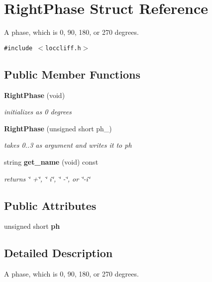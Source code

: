 \section{Right\-Phase Struct Reference}
\label{structRightPhase}
A phase, which is 0, 90, 180, or 270 degrees.  


{\tt \#include $<$loccliff.h$>$}

\subsection*{Public Member Functions}
\begin{CompactItemize}
\item 
{\bf Right\-Phase} (void)\label{structRightPhase_a0}

\begin{CompactList}\small\item\em initializes as 0 degrees \item\end{CompactList}\item 
{\bf Right\-Phase} (unsigned short ph\_\-)\label{structRightPhase_a1}

\begin{CompactList}\small\item\em takes 0..3 as argument and writes it to ph \item\end{CompactList}\item 
string {\bf get\_\-name} (void) const \label{structRightPhase_a2}

\begin{CompactList}\small\item\em returns \char`\"{} +\char`\"{}, \char`\"{} i\char`\"{}, \char`\"{} -\char`\"{}, or \char`\"{}-i\char`\"{} \item\end{CompactList}\end{CompactItemize}
\subsection*{Public Attributes}
\begin{CompactItemize}
\item 
unsigned short {\bf ph}
\end{CompactItemize}


\subsection{Detailed Description}
A phase, which is 0, 90, 180, or 270 degrees. 



